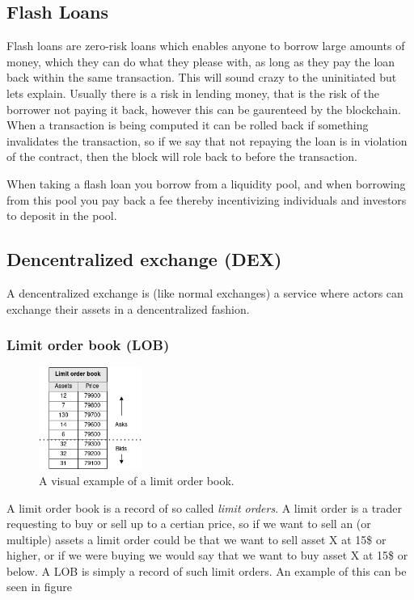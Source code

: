 \subsection{Flash Loans}
Flash loans are zero-risk loans which enables anyone to borrow large amounts of money, which they can do what they please with, as long as they pay the loan back within the same transaction. This will sound crazy to the uninitiated but lets explain. Usually there is a risk in lending money, that is the risk of the borrower not paying it back, however this can be gaurenteed by the blockchain. When a transaction is being computed it can be rolled back if something invalidates the transaction, so if we say that not repaying the loan is in violation of the contract, then the block will role back to before the transaction.

When taking a flash loan you borrow from a liquidity pool, and when borrowing from this pool you pay back a fee thereby incentivizing individuals and investors to deposit in the pool.

\subsection{Dencentralized exchange (DEX)}
A dencentralized exchange is (like normal exchanges) a service where actors can exchange their assets in a dencentralized fashion.

\subsubsection{Limit order book (LOB)}
\begin{figure}
  \centering
  \includegraphics[width=0.3\textwidth]{assests/Flash-loans-LOB}
  \caption{A visual example of a limit order book.}
  \label{fig:LOB}
\end{figure}
A limit order book is a record of so called \textit{limit orders}. A limit order is a trader requesting to buy or sell up to a certian price, so if we want to sell an (or multiple) assets a limit order could be that we want to sell asset X at 15\$ or higher, or if we were buying we would say that we want to buy asset X at 15\$ or below. A LOB is simply a record of such limit orders. An example of this can be seen in figure


